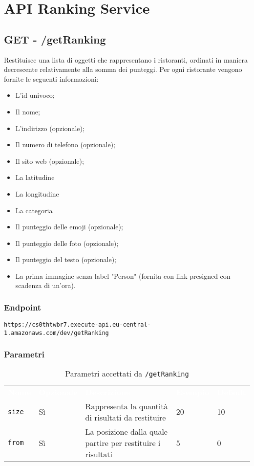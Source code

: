 \section{API Ranking Service}


\subsection{GET - /getRanking}
Restituisce una lista di oggetti che rappresentano i ristoranti, ordinati in maniera decrescente relativamente alla somma dei punteggi. Per ogni ristorante vengono fornite le seguenti informazioni:
\begin{itemize}
	\item L'id univoco;
    \item Il nome;
    \item L'indirizzo (opzionale);
    \item Il numero di telefono (opzionale);
    \item Il sito web (opzionale);
    \item La latitudine
    \item La longitudine
    \item La categoria 
    \item Il punteggio delle emoji (opzionale);
    \item Il punteggio delle foto (opzionale);
    \item Il punteggio del testo (opzionale);
	\item La prima immagine senza label "Person" (fornita con link presigned con scadenza di un'ora).
\end{itemize}

\subsubsection{Endpoint}
\texttt{https://cs0thtwbr7.execute-api.eu-central-1.amazonaws.com/dev/getRanking}

\subsubsection{Parametri}
\begin{table}[!htbp]
\renewcommand{\arraystretch}{1.5}

\begin{tabular}[t]{ m{}<{\centering}  m{}<{\centering} m{}<{\centering} m{}<{\centering}  m{}<{\centering} }
	\rowcolor{darkblue}
	\textcolor{white}{\textbf{Nome}} &\textcolor{white}{\textbf{Opzionale}} &\textcolor{white}{\textbf{Descrizione}} &\textcolor{white}{\textbf{Esempio}} &\textcolor{white}{\textbf{Default}} \\ 
\texttt{size} & Sì & Rappresenta la quantità di risultati da restituire & 20 & 10 \\
\texttt{from} & Sì & La posizione dalla quale partire per restituire i risultati & 5 & 0 \\


\end{tabular}


\caption{Parametri accettati da \texttt{/getRanking}}
\end{table}

